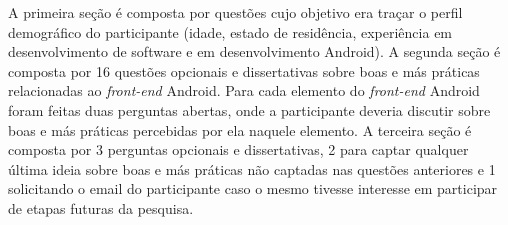 
A primeira seção é composta por questões cujo objetivo era traçar o perfil demográfico do participante (idade, estado de residência, experiência em desenvolvimento de software e em desenvolvimento Android).
A segunda seção é composta por 16 questões opcionais e dissertativas sobre boas e más práticas relacionadas ao \textit{front-end} Android. Para cada elemento do \textit{front-end} Android foram feitas duas perguntas abertas, onde a participante deveria discutir sobre boas e más práticas percebidas por ela naquele elemento. 
A terceira seção é composta por 3 perguntas opcionais e dissertativas, 2 para captar qualquer última ideia sobre boas e más práticas não captadas nas questões anteriores e 1 solicitando o email do participante caso o mesmo tivesse interesse em participar de etapas futuras da pesquisa. 








